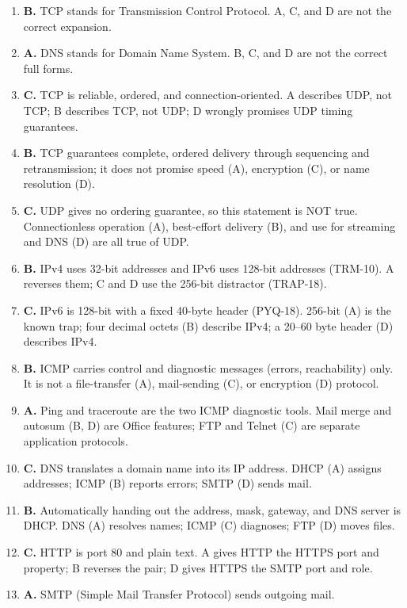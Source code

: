\begin{enumerate}[label=\textbf{Q\arabic*.}, leftmargin=*]
\item \textbf{B.} TCP stands for Transmission Control Protocol. A, C, and D
  are not the correct expansion.
\item \textbf{A.} DNS stands for Domain Name System. B, C, and D are not the
  correct full forms.
\item \textbf{C.} TCP is reliable, ordered, and connection-oriented. A
  describes UDP, not TCP; B describes TCP, not UDP; D wrongly promises UDP
  timing guarantees.
\item \textbf{B.} TCP guarantees complete, ordered delivery through
  sequencing and retransmission; it does not promise speed (A), encryption
  (C), or name resolution (D).
\item \textbf{C.} UDP gives no ordering guarantee, so this statement is NOT
  true. Connectionless operation (A), best-effort delivery (B), and use for
  streaming and DNS (D) are all true of UDP.
\item \textbf{B.} IPv4 uses 32-bit addresses and IPv6 uses 128-bit addresses
  (TRM-10). A reverses them; C and D use the 256-bit distractor (TRAP-18).
\item \textbf{C.} IPv6 is 128-bit with a fixed 40-byte header (PYQ-18).
  256-bit (A) is the known trap; four decimal octets (B) describe IPv4; a
  20--60 byte header (D) describes IPv4.
\item \textbf{B.} ICMP carries control and diagnostic messages (errors,
  reachability) only. It is not a file-transfer (A), mail-sending (C), or
  encryption (D) protocol.
\item \textbf{A.} Ping and traceroute are the two ICMP diagnostic tools. Mail
  merge and autosum (B, D) are Office features; FTP and Telnet (C) are
  separate application protocols.
\item \textbf{C.} DNS translates a domain name into its IP address. DHCP (A)
  assigns addresses; ICMP (B) reports errors; SMTP (D) sends mail.
\item \textbf{B.} Automatically handing out the address, mask, gateway, and
  DNS server is DHCP. DNS (A) resolves names; ICMP (C) diagnoses; FTP (D)
  moves files.
\item \textbf{C.} HTTP is port 80 and plain text. A gives HTTP the HTTPS
  port and property; B reverses the pair; D gives HTTPS the SMTP port and
  role.
\item \textbf{A.} SMTP (Simple Mail Transfer Protocol) sends outgoing mail.

\end{enumerate}
